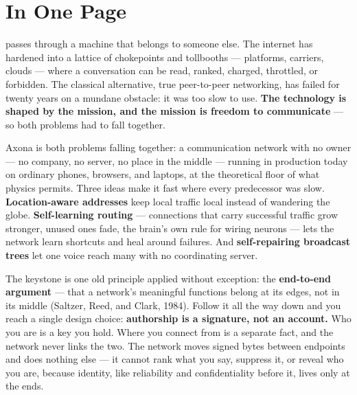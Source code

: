 \documentclass[nobib,justified]{tufte-handout}
\begin{document}
\pagestyle{axonaplain}
\thispagestyle{axonaplain}
\setcounter{page}{1}

\section{In One Page}
\enlargethispage{3\baselineskip}\thispagestyle{empty}

 passes through a machine that
belongs to someone else. The internet has hardened into a lattice of
chokepoints and tollbooths --- platforms, carriers, clouds --- where a
conversation can be read, ranked, charged, throttled, or forbidden. The classical alternative, true peer-to-peer networking, has
failed for twenty years on a mundane obstacle: it was too slow to use.
\textbf{The technology is shaped by the mission, and the mission is freedom
to communicate} --- so both problems had to fall
together.

Axona is both problems falling together: a communication network with no
owner --- no company, no server, no place in the middle --- running in
production today on ordinary
phones, browsers, and laptops, at the theoretical floor of what physics
permits. Three ideas make it fast where
every predecessor was slow. \textbf{Location-aware addresses} keep local
traffic local instead of wandering the globe. \textbf{Self-learning routing}
--- connections that carry successful traffic grow stronger, unused ones
fade, the brain's own rule for wiring neurons --- lets the network learn
shortcuts and heal around failures. And \textbf{self-repairing broadcast
trees} let one voice reach many with no coordinating server.

The keystone is one old principle applied without exception: the
\textbf{end-to-end argument} --- that a network's meaningful functions
belong at its edges, not in its middle (Saltzer, Reed, and Clark, 1984).
Follow it all the way down and you reach a single design choice:
\textbf{authorship is a signature, not an account.} Who you are is a key
you hold. Where you connect from is a separate fact, and the network never
links the two. The network moves signed bytes between endpoints
and does nothing else --- it cannot rank what you say, suppress it, or
reveal who you are, because identity, like reliability and confidentiality
before it, lives only at the ends.
\end{document}
